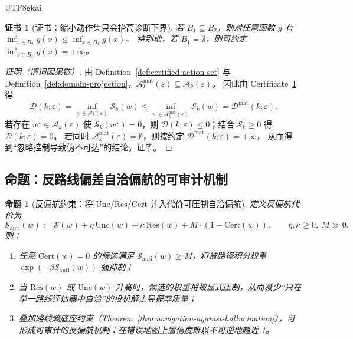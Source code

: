 \documentclass[12pt]{article}
\newtheorem{proposition}{命题}[section]
\newtheorem{certificate}{证书}[section]
\begin{document}
\begin{CJK*}{UTF8}{gkai}
\begin{certificate}[证书：缩小动作集只会抬高诊断下界]
\label{cert:ctrl-first-class-necessary}
若 $B_1\subseteq B_2$，则对任意函数 $g$ 有 $\inf_{x\in B_2}g(x)\le \inf_{x\in B_1}g(x)$。
特别地，若 $B_1=\emptyset$，则可约定 $\inf_{x\in B_1}g(x)=+\infty$。
\end{certificate}

\begin{proof}[证明（谓词因果链）]
由 Definition~\ref{def:certified-action-set} 与 Definition~\ref{def:domain-projection}，$\mathcal{A}_k^{\mathrm{mat}}
  (\varepsilon)\subseteq \mathcal{A}_k(\varepsilon)$。
因此由 Certificate~\ref{cert:ctrl-first-class-necessary} 得
\[
\mathcal{D}(k;\varepsilon)=\inf_{w\in\mathcal{A}_k(\varepsilon)}\mathcal{S}_k(w)\le \inf_{w\in\mathcal{A}_k^{\mathrm{mat}
  }(\varepsilon)}\mathcal{S}_k(w)=\mathcal{D}^{\mathrm{mat}}(k;\varepsilon).
\]
若存在 $w^\star\in\mathcal{A}_k(\varepsilon)$ 使 $\mathcal{S}_k(w^\star)=0$，则 $\mathcal{D}(k;\varepsilon)\le 0$；结合
  $\mathcal{S}_k\ge 0$ 得 $\mathcal{D}(k;\varepsilon)=0$。
若同时 $\mathcal{A}_k^{\mathrm{mat}}(\varepsilon)=\emptyset$，则按约定 $\mathcal{D}^{\mathrm{mat}}(k;\varepsilon)=+\infty$，
  从而得到“忽略控制导致伪不可达”的结论。证毕。
\end{proof}

\subsection{命题：反路线偏差自洽偏航的可审计机制}

\begin{proposition}[反偏航约束：将 $\mathrm{Unc}/\mathrm{Res}/\mathrm{Cert}$ 并入代价可压制自洽偏航]
\label{prop:anti-drift-constraint}
定义反偏航代价为
\[
\mathcal{S}_{\mathrm{anti}}(w)
:=
\mathcal{S}(w)+\eta\,\mathrm{Unc}(w)+\kappa\,\mathrm{Res}(w)+M\cdot(1-\mathrm{Cert}(w)),
\qquad \eta,\kappa\ge 0,\ M\gg 0.
\]
则：
\begin{enumerate}
  \item 任意 $\mathrm{Cert}(w)=0$ 的候选满足 $\mathcal{S}_{\mathrm{anti}}(w)\ge M$，将被路径积分权重 $\exp(-\beta \mathcal{S}
    _{\mathrm{anti}}(w))$ 强抑制；
  \item 当 $\mathrm{Res}(w)$ 或 $\mathrm{Unc}(w)$ 升高时，候选的权重将被显式压制，从而减少“只在单一路线评估器中自洽”的投机解主导概率质量；
  \item 叠加路线熵底座约束（Theorem~\ref{thm:navigation-against-hallucination}），可形成可审计的反偏航机制：在错误地图上置信度难以不可逆地趋近 1。
\end{enumerate}
\end{proposition}


\end{CJK*}
\end{document}
